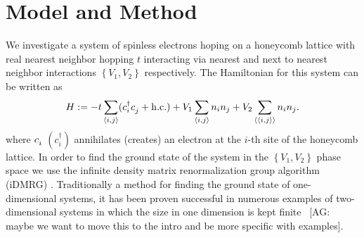 \documentclass[aps,prx,10pt,twocolumn,floatfix,superscriptaddress,showpacs,numerical,footinbib]{revtex4-1}
\newcommand{\noteAG}[1]{{\color{blue} [AG: #1]}}
\newcommand{\bs}[1]{{\boldsymbol{#1}}}
\begin{document}
\section{\label{sec:modandmeth}Model and Method}
%
We investigate a system of spinless electrons hoping on a honeycomb lattice with real nearest neighbor hopping $t$ interacting via nearest and next to nearest neighbor interactions 
$\left\lbrace V_{1},V_{2}\right\rbrace$ respectively. 
%
The Hamiltonian for this system can be written as
\begin{equation}
%
 H:=-t\sum_{\left\langle i,j\right\rangle}(c^{\dagger}_{i}c^{\vphantom{\dagger}}_{j}+ \mathrm{h.c.})+
V_{1}\sum_{\left\langle i,j\right\rangle }n_{i}n_{j}+
%
V_{2}\sum_{\left\langle \left\langle i,j\right\rangle \right\rangle }n_{i}n_{j}.
%
\label{eq:H}
\end{equation}
%
where $c_{i}^{\vphantom{\dagger}}$ $(c^{\dagger}_{i})$  annihilates (creates) an electron at the $i$-th site of the honeycomb lattice.
%
%
In order to find the ground state of the system in the $\left\lbrace V_{1},V_{2}\right\rbrace$ phase space
we use the infinite density matrix renormalization group algorithm (iDMRG) \cite{M08,W92,KZM13}.
%
Traditionally a method for finding the ground state of one-dimensional systems, it has been proven successful in numerous examples of two-dimensional systems in which the size in one dimension is kept finite~\cite{papers}\noteAG{maybe we want to move this to the intro and be more specific with examples}. 
\end{document}
